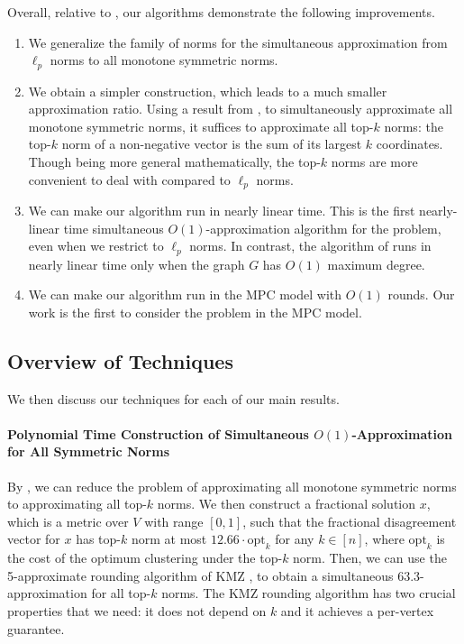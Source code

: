 \documentclass[11pt]{article}
\newcommand{\opt}{{\mathrm{opt}}}
\begin{document}
\begin{CJK*}{UTF8}{gbsn}
Overall, relative to \cite{davies2023one}, our algorithms demonstrate the following improvements.
\begin{enumerate}[leftmargin=*]
    \item We generalize the family of norms for the simultaneous approximation from $\ell_p$ norms to all monotone symmetric norms.
    \item We obtain a simpler construction, which leads to a much smaller approximation ratio. Using a result from \cite{chakrabarty2019approximation}, to simultaneously approximate all monotone symmetric norms, it suffices to approximate all top-$k$ norms: the top-$k$ norm of a non-negative vector is the sum of its largest $k$ coordinates. Though being more general mathematically, the top-$k$ norms are more convenient to deal with compared to $\ell_p$ norms. 
    \item We can make our algorithm run in nearly linear time. This is the first nearly-linear time simultaneous $O(1)$-approximation algorithm for the problem, even when we restrict to $\ell_p$ norms. In contrast, the algorithm of \cite{davies2023one} runs in nearly linear time only when the graph $G$ has $O(1)$ maximum degree.
    \item We can make our algorithm run in the MPC model with $O(1)$ rounds. Our work is the first to consider the problem in the MPC model. 
\end{enumerate}

\subsection{Overview of Techniques} We then discuss our techniques for each of our main results. 
\paragraph{Polynomial Time Construction of Simultaneous $O(1)$-Approximation for All Symmetric Norms} By \cite{chakrabarty2019approximation}, we can reduce the problem of approximating all monotone symmetric norms to approximating all top-$k$ norms.  We then construct a fractional solution $x$, which is a metric over $V$ with range $[0, 1]$, such that the fractional disagreement vector for $x$ has top-$k$ norm at most $12.66 \cdot \opt_k$ for any $k \in [n]$, where $\opt_k$ is the cost of the optimum clustering under the top-$k$ norm. Then, we can use the 5-approximate rounding algorithm of KMZ \cite{kalhan2019correlation}, to obtain a simultaneous $63.3$-approximation for all top-$k$ norms.  The KMZ rounding algorithm has two crucial properties that we need: it does not depend on $k$ and it achieves a per-vertex guarantee. 


\end{CJK*}
\end{document}
